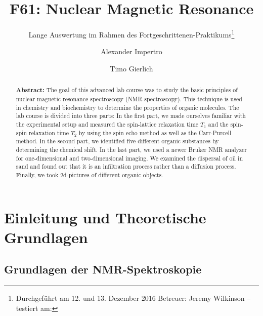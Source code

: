 \documentclass[a4paper]{scrartcl} %
\begin{document}
\author{Alexander Impertro \and Timo Gierlich}
\title{F61: Nuclear Magnetic Resonance}
\subtitle{Lange Auswertung im Rahmen des Fortgeschrittenen-Praktikums\footnote{Durchgeführt am 12. und 13. Dezember 2016 \newline Betreuer: Jeremy Wilkinson -- testiert am:}}
\maketitle




\begin{abstract}


	\textbf{Abstract:} The goal of this advanced lab course was to study the basic principles of nuclear magnetic resonance spectroscopy (NMR spectroscopy). This technique is used in chemistry and biochemistry to determine the properties of organic molecules. The lab course is divided into three parts: In the first part, we made ourselves familiar with the experimental setup and measured the spin-lattice relaxation time $T_1$ and the spin-spin relaxation time $T_2$ by using the spin echo method as well as the Carr-Purcell method. In the second part, we identified five different organic substances by determining the chemical  shift. In the last part, we used a newer Bruker NMR analyzer for one-dimensional and two-dimensional imaging. We examined the dispersal of oil in sand and found out that it is an infiltration process rather than a diffusion process. Finally, we took 2d-pictures of different organic objects.
\end{abstract}

\newpage

\tableofcontents

\newpage

\section{Einleitung und Theoretische Grundlagen}

\subsection{Grundlagen der NMR-Spektroskopie}
\end{document}

